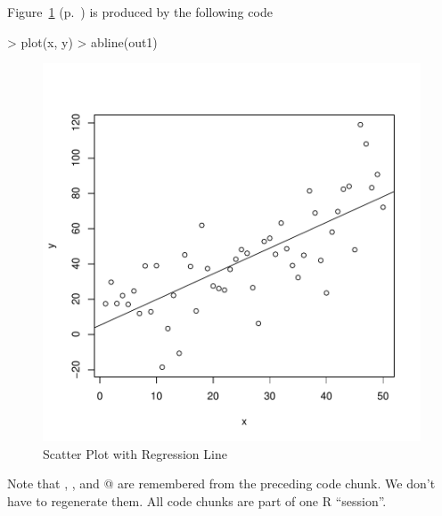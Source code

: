 \documentclass[12pt]{article}
\begin{document}
Figure~\ref{fig:one} (p.~\pageref{fig:one})
is produced by the following code
\begin{Schunk}
\begin{Sinput}
> plot(x, y)
> abline(out1)
\end{Sinput}
\end{Schunk}
\begin{figure}
\begin{center}
\includegraphics{sweaveTemplate-fig1}
\end{center}
\caption{Scatter Plot with Regression Line}
\label{fig:one}
\end{figure}
Note that \verb@x@, \verb@y@, and @ are remembered from
the preceding code chunk.  We don't have to regenerate them.
All code chunks are part of one R ``session''.
\end{document}
